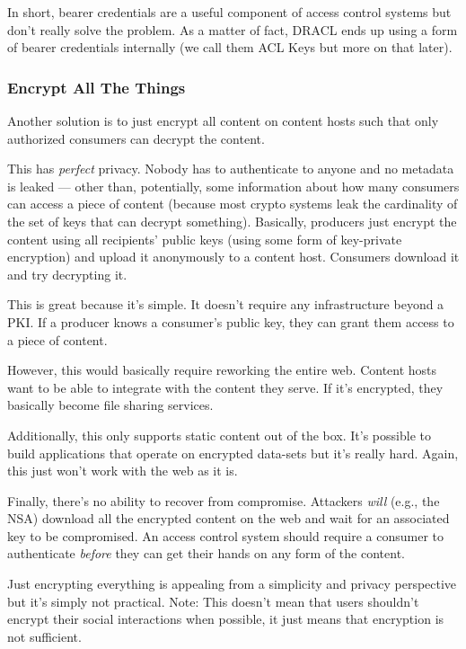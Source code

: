 \documentclass[pdftex,12pt,a4papaer,twoside,notitlepage]{report}
\begin{document}
In short, bearer credentials are a useful component of access control systems
but don't really solve the problem. As a matter of fact, DRACL ends up using a
form of bearer credentials internally (we call them ACL Keys but more on that
later).

\subsubsection{Encrypt All The Things}

Another solution is to just encrypt all content on content hosts such that only
authorized consumers can decrypt the content.

This has \emph{perfect} privacy. Nobody has to authenticate to anyone and no
metadata is leaked --- other than, potentially, some information about how many
consumers can access a piece of content (because most crypto systems leak the
cardinality of the set of keys that can decrypt something). Basically, producers
just encrypt the content using all recipients' public keys (using some form of
key-private encryption) and upload it anonymously to a content host. Consumers
download it and try decrypting it.

This is great because it's simple. It doesn't require any infrastructure beyond
a PKI. If a producer knows a consumer's public key, they can grant them access
to a piece of content.

However, this would basically require reworking the entire web. Content hosts
want to be able to integrate with the content they serve. If it's encrypted,
they basically become file sharing services.

Additionally, this only supports static content out of the box. It's possible to
build applications that operate on encrypted data-sets but it's really hard.
Again, this just won't work with the web as it is.

Finally, there's no ability to recover from compromise. Attackers \emph{will}
(e.g., the NSA) download all the encrypted content on the web and wait for an
associated key to be compromised. An access control system should require a
consumer to authenticate \emph{before} they can get their hands on any form of
the content.

Just encrypting everything is appealing from a simplicity and privacy
perspective but it's simply not practical. Note: This doesn't mean that users
shouldn't encrypt their social interactions when possible, it just means that
encryption is not sufficient.
\end{document}

